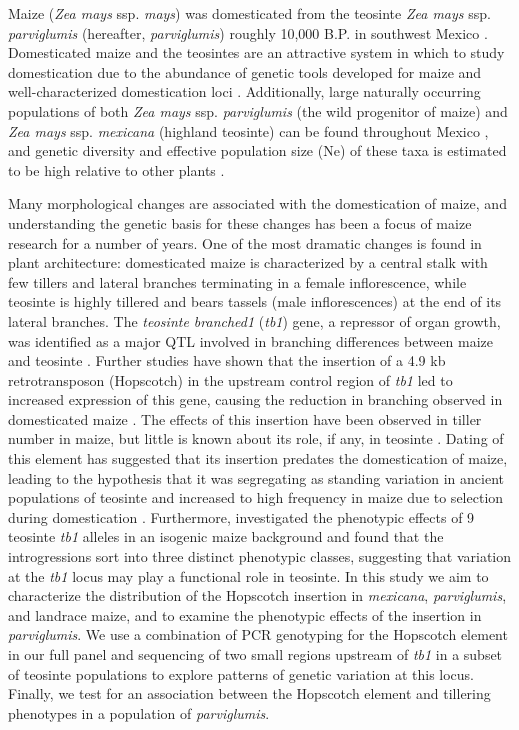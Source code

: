 \documentclass[12pt]{article}
\begin{document}
Maize (\emph{Zea mays} ssp. \emph{mays}) was domesticated from the teosinte \emph{Zea mays} ssp. \emph{parviglumis} (hereafter, \emph{parviglumis}) roughly 10,000 B.P. in southwest Mexico \cite{Piperno et al 2009, Matsuoka et al 2002}. Domesticated maize and the teosintes are an attractive system in which to study domestication due to the abundance of genetic tools developed for maize and well-characterized domestication loci \cite{Hufford et al 2012a, Doebley 2004, Hufford et al 2012b}. Additionally, large naturally occurring populations of both \emph{Zea mays} ssp. \emph{parviglumis} (the wild progenitor of maize) and \emph{Zea mays} ssp. \emph{mexicana} (highland teosinte) can be found throughout Mexico \cite{Wilkes 1977, Hufford et al 2013}, and genetic diversity and effective population size (Ne) of these taxa is estimated to be high \cite{Ross-Ibarra et al 2009} relative to other plants \cite{Nybom 2004}.

Many morphological changes are associated with the domestication of maize, and understanding the genetic basis for these changes has been a focus of maize research for a number of years. One of the most dramatic changes is found in plant architecture: domesticated maize is characterized by a central stalk with few tillers and lateral branches terminating in a female inflorescence, while teosinte is highly tillered and bears tassels (male inflorescences) at the end of its lateral branches. The \emph{teosinte branched1} (\emph{tb1}) gene, a repressor of organ growth, was identified as a major QTL involved in branching differences between maize and teosinte \cite{Doebley et al 1990, Doebley and Stec 1991, Lukens and Doebley 1999}. Further studies have shown that the insertion of a 4.9 kb retrotransposon (Hopscotch) in the upstream control region of \emph{tb1} led to increased expression of this gene, causing the reduction in branching observed in domesticated maize \cite{Studer et al 2011}. The effects of this insertion have been observed in tiller number in maize, but little is known about its role, if any, in teosinte \cite{Studer et al 2011}. Dating of this element has suggested that its insertion predates the domestication of maize, leading to the hypothesis that it was segregating as standing variation in ancient populations of teosinte and increased to high frequency in maize due to selection during domestication \cite{Studer et al 2011}. Furthermore, \cite{Studer and Doebley 2012} investigated the phenotypic effects of 9 teosinte \emph{tb1} alleles in an isogenic maize background and found that the introgressions sort into three distinct phenotypic classes, suggesting that variation at the \emph{tb1} locus may play a functional role in teosinte. In this study we aim to characterize the distribution of the Hopscotch insertion in \emph{mexicana}, \emph{parviglumis}, and landrace maize, and to examine the phenotypic effects of the insertion in \emph{parviglumis}. We use a combination of PCR genotyping for the Hopscotch element in our full panel and sequencing of two small regions upstream of \emph{tb1} in a subset of teosinte populations to explore patterns of genetic variation at this locus. Finally, we test for an association between the Hopscotch element and tillering phenotypes in a population of \emph{parviglumis}.
\end{document}
